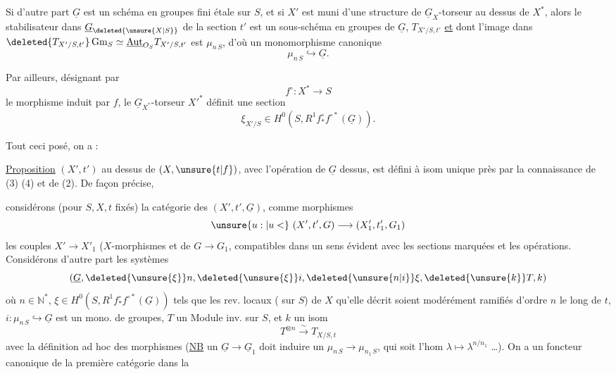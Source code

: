 Si d'autre part $\underline G$ est un schéma en groupes fini étale sur $S$, et si $X'$ est muni d'une structure de $\underline G_X$-torseur au dessus de $X^\ast$, alors le stabilisateur
dans $\underline G_{\deleted{\unsure{X|S}}}$  de la section $t'$ est un sous-schéma en groupes  de $\underline G$,     $T_{X'/S,t'}$ \uline{et} dont l'image dans $\deleted{T_{X'/S,t'}}\,\mathrm{Gm}_S\simeq\underline{\mathrm{Aut}}_{O_S}T_{X'/S,t'}$ est $\mu_{n\,S}$, d'où un monomorphisme canonique
\[
\mu_{n\,S}\hookrightarrow\underline G . \tag*{(3)}
\]

Par ailleurs, désignant par
\[
f^\circ:X^\ast\longrightarrow S
\]
le morphisme induit par $f$, le $\underline G_{X^\ast}$-torseur $X'^\ast$ définit une section
\[
\xi_{X'/S}\in H^0(S,R^1 f^\circ_\ast f^{\circ\ast}(\underline G)) . \tag*{(4)}
\]

Tout ceci posé, on a :

\uline{Proposition} \quad $(X',t')$ au dessus de $(X,\unsure{t|f})$, avec l'opération de $\underline G$ dessus, est défini à isom unique près par la connaissance de (3) (4) et de (2).  De façon précise,

 considérons (pour $S,X,t$ fixés) la catégorie des $(X',t',\underline G)$,   comme morphismes
\[
\unsure{u:|u<}\ (X',t',G)\longrightarrow(X'_1,t'_1,G_1)
\]
les  couples  $X'\to X'_1$ ($X$-morphismes et de $G\to G_1$, compatibles dans un sens évident avec les sections marquées et les opérations. Considérons d'autre part les  systèmes
\[
(\underline G,\deleted{\unsure{\xi}}n,\deleted{\unsure{\xi}}i,\deleted{\unsure{n|i}}\xi,\deleted{\unsure{k}}T,k)
\]
où $n\in\mathbb N^\ast$,  $\xi\in H^0(S,R^1f^\circ_\ast f^{\circ\ast}(\underline G))$ tels que les rev. locaux ( sur $S$) de $X$ qu'elle décrit soient modérément ramifiés d'ordre $n$ le long de $t$, $i:\mu_{n\,S}\hookrightarrow\underline G$ est un mono. de groupes, $T$ un Module inv. sur $S$, et $k$ un isom
\[
T^{\otimes n}\xrightarrow{\sim} T_{X/S,t}
\]
avec la définition ad hoc des morphismes (\uline{NB}  un $\underline G\to\underline G_1$ doit induire un  $\mu_{n\,S}\to\mu_{n_1\,S}$, qui soit l'hom  $\lambda\longmapsto\lambda^{n/n_1}$ \ldots). On a un foncteur canonique de la première catégorie dans la


